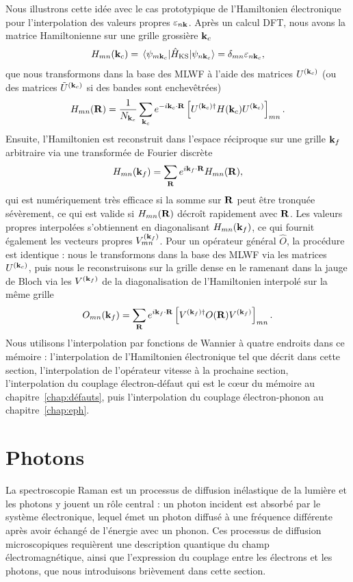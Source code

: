 Nous illustrons cette idée avec le cas prototypique de l'Hamiltonien électronique pour l'interpolation des valeurs propres $\varepsilon_{n\mathbf{k}}$. Après un calcul DFT, nous avons la matrice Hamiltonienne sur une grille grossière $\mathbf{k}_c$
\begin{equation}
    H_{mn}(\kv_c) = \matrixel{\psi_{m\kv_c}}{\hat{H}_\text{KS}}{\psi_{n\kv_c}}=\delta_{mn}\varepsilon_{n\kv_c},
\end{equation}
que nous transformons dans la base des MLWF à l'aide des matrices $U^{(\mathbf{k}_c)}$ (ou des matrices $\tilde{U}^{(\mathbf{k}_c)}$ si des bandes sont enchevêtrées)
\begin{equation}
    H_{mn}(\mathbf{R}) = \frac{1}{N_{\mathbf{k}_c}}\sum_{\mathbf{k}_c}e^{-i\mathbf{k}_c\cdot\mathbf{R}}\left[U^{(\mathbf{k}_c)\dag}H(\mathbf{k}_c)U^{(\mathbf{k}_c)}\right]_{mn}.
\end{equation}
Ensuite, l'Hamiltonien est reconstruit dans l'espace réciproque sur une grille $\mathbf{k}_f$ arbitraire via une transformée de Fourier discrète
\begin{equation}
    H_{mn}(\mathbf{k}_f) = \sum_{\mathbf{R}} e^{i\mathbf{k}_f\cdot\mathbf{R}}H_{mn}(\mathbf{R}),
\end{equation}
qui est numériquement très efficace si la somme sur $\mathbf{R}$ peut être tronquée sévèrement, ce qui est valide si $H_{mn}(\mathbf{R})$ décroît rapidement avec $\mathbf{R}$. Les valeurs propres interpolées s'obtiennent en diagonalisant $H_{mn}(\mathbf{k}_f)$, ce qui fournit également les vecteurs propres $V_{mn}^{(\mathbf{k}_f)}$. Pour un opérateur général $\hat{O}$, la procédure est identique : nous le transformons dans la base des MLWF via les matrices $U^{(\mathbf{k}_c)}$, puis nous le reconstruisons sur la grille dense en le ramenant dans la jauge de Bloch via les $V^{(\mathbf{k}_f)}$ de la diagonalisation de l'Hamiltonien interpolé sur la même grille
\begin{equation}
    O_{mn}(\mathbf{k}_f) = \sum_{\mathbf{R}}e^{i\mathbf{k}_f\cdot\mathbf{R}}\left[V^{(\mathbf{k}_f)\dag}O(\mathbf{R})V^{(\mathbf{k}_f)}\right]_{mn}.
\end{equation}
Nous utilisons l'interpolation par fonctions de Wannier à quatre endroits dans ce mémoire : l'interpolation de l'Hamiltonien électronique tel que décrit dans cette section, l'interpolation de l'opérateur vitesse à la prochaine section, l'interpolation du couplage électron-défaut qui est le c\oe ur du mémoire au chapitre~\ref{chap:défauts}, puis l'interpolation du couplage électron-phonon au chapitre~\ref{chap:eph}.

\section{Photons}\label{sec:photon}
La spectroscopie Raman est un processus de diffusion inélastique de la lumière et les photons y jouent un rôle central : un photon incident est absorbé par le système électronique, lequel émet un photon diffusé à une fréquence différente après avoir échangé de l'énergie avec un phonon. Ces processus de diffusion microscopiques requièrent une description quantique du champ électromagnétique, ainsi que l'expression du couplage entre les électrons et les photons, que nous introduisons brièvement dans cette section.

